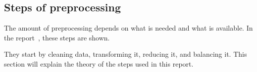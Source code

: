   
  
\subsection{Steps of preprocessing}\label{subsec:preprocessing-steps}
The amount of preprocessing depends on what is needed and what is available. In the report~\cite{Data-preprocessing-for-flight-delays}, these steps are shown. 

They start by cleaning data, transforming it, reducing it, and balancing it. This section will explain the theory of the steps used in this report.






  

  


 

